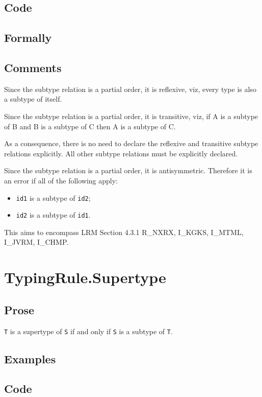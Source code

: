 \documentclass{book}
\begin{document}
  \subsection{Code}

  \subsection{Formally}

\subsection{Comments}
  Since the subtype relation is a partial order, it is reflexive, viz, 
  every type is also a subtype of itself.

  Since the subtype relation is a partial order, it is transitive, viz, if A is
  a subtype of B and B is a subtype of C then A is a subtype of C.
 
  As a consequence, there is no need to declare the reflexive and transitive
  subtype relations explicitly. All other subtype relations must be explicitly
  declared.
 
  Since the subtype relation is a partial order, it is antisymmetric. Therefore
  it is an error if all of the following apply:
  \begin{itemize}
  \item \texttt{id1} is a subtype of \texttt{id2};
  \item \texttt{id2} is a subtype of \texttt{id1}.
  \end{itemize}

  This aims to encompass LRM Section 4.3.1 R\_NXRX, I\_KGKS, I\_MTML, I\_JVRM, I\_CHMP.

\section{TypingRule.Supertype}

  \subsection{Prose}
  \texttt{T} is a supertype of \texttt{S} if and only if \texttt{S} is a subtype of \texttt{T}.

  \subsection{Examples}

  \subsection{Code}
\end{document}
